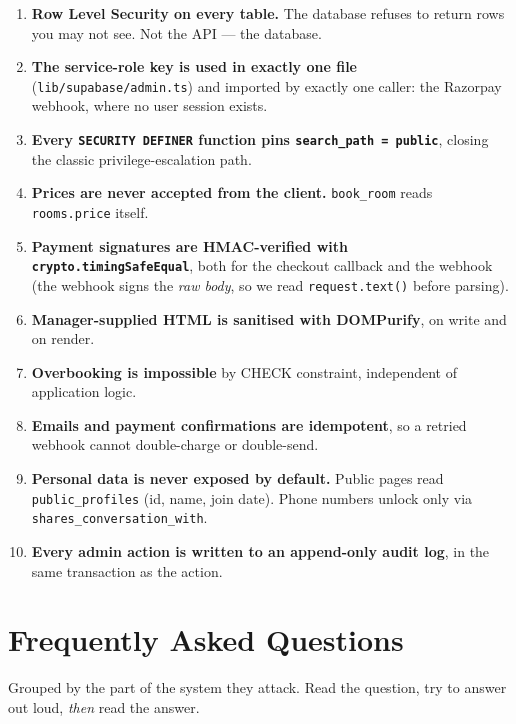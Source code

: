 \documentclass[11pt,a4paper]{article}
\newcommand{\file}[1]{\texttt{\small #1}}
\begin{document}
\begin{enumerate}[leftmargin=*]
  \item \textbf{Row Level Security on every table.} The database refuses to return
        rows you may not see. Not the API --- the database.
  \item \textbf{The service-role key is used in exactly one file}
        (\file{lib/supabase/admin.ts}) and imported by exactly one caller: the
        Razorpay webhook, where no user session exists.
  \item \textbf{Every \texttt{SECURITY DEFINER} function pins
        \texttt{search\_path = public}}, closing the classic privilege-escalation
        path.
  \item \textbf{Prices are never accepted from the client.} \texttt{book\_room}
        reads \texttt{rooms.price} itself.
  \item \textbf{Payment signatures are HMAC-verified with
        \texttt{crypto.timingSafeEqual}}, both for the checkout callback and the
        webhook (the webhook signs the \emph{raw body}, so we read
        \texttt{request.text()} before parsing).
  \item \textbf{Manager-supplied HTML is sanitised with DOMPurify}, on write and
        on render.
  \item \textbf{Overbooking is impossible} by CHECK constraint, independent of
        application logic.
  \item \textbf{Emails and payment confirmations are idempotent}, so a retried
        webhook cannot double-charge or double-send.
  \item \textbf{Personal data is never exposed by default.} Public pages read
        \texttt{public\_profiles} (id, name, join date). Phone numbers unlock only
        via \texttt{shares\_conversation\_with}.
  \item \textbf{Every admin action is written to an append-only audit log}, in the
        same transaction as the action.
\end{enumerate}

\newpage
\section{Frequently Asked Questions}

Grouped by the part of the system they attack. Read the question, try to answer
out loud, \emph{then} read the answer.
\end{document}
